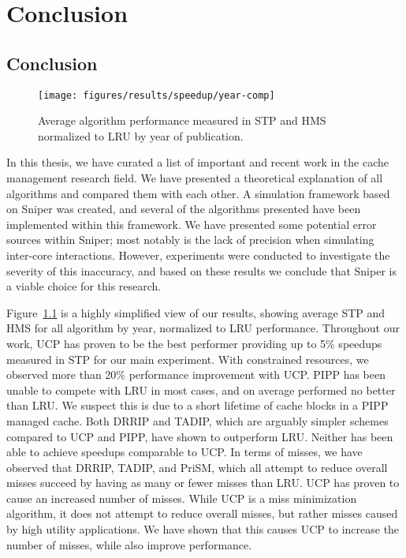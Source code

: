 
\chapter{Conclusion}
\label{cpt:conclusion}

\section{Conclusion}

\begin{figure}[ht]
    \centering
    \texttt{[image: figures/results/speedup/year-comp]}
    \label{fig:conclusion:yearcomp}
    \caption{Average algorithm performance measured in STP and HMS normalized to LRU by year of publication.}
\end{figure}


In this thesis, we have curated a list of important and recent work in the cache management research field.
We have presented a theoretical explanation of all algorithms and compared them with each other.
A simulation framework based on Sniper was created, and several of the algorithms presented have been implemented within this framework.
We have presented some potential error sources within Sniper; most notably is the lack of precision when simulating inter-core interactions.
However, experiments were conducted to investigate the severity of this inaccuracy, and based on these results we conclude that Sniper is a viable choice for this research.

Figure~\ref{fig:conclusion:yearcomp} is a highly simplified view of our results, showing average STP and HMS for all algorithm by year, normalized to LRU performance.
Throughout our work, UCP has proven to be the best performer providing up to 5\% speedups measured in STP for our main experiment.
With constrained resources, we observed more than 20\% performance improvement with UCP.
PIPP has been unable to compete with LRU in most cases, and on average performed no better than LRU.
We suspect this is due to a short lifetime of cache blocks in a PIPP managed cache.
Both DRRIP and TADIP, which are arguably simpler schemes compared to UCP and PIPP, have shown to outperform LRU.
Neither has been able to achieve speedups comparable to UCP.
In terms of misses, we have observed that DRRIP, TADIP, and PriSM, which all attempt to reduce overall misses succeed by having as many or fewer misses than LRU.
UCP has proven to cause an increased number of misses.
While UCP is a miss minimization algorithm, it does not attempt to reduce overall misses, but rather misses caused by high utility applications.
We have shown that this causes UCP to increase the number of misses, while also improve performance.


